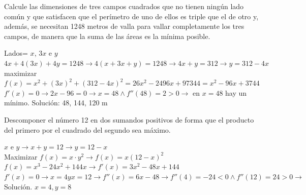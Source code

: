 \documentclass[addpoints,spanish, 12pt,a4paper]{exam}
\begin{document}
\begin{questions}


\question[3] Calcule las dimensiones de tres campos cuadrados que no tienen ningún lado común y que
satisfacen que el perímetro de uno de ellos es triple que el de otro y, además, se necesitan 1248 metros de
valla para vallar completamente los tres campos, de manera que la suma de las áreas es la mínima posible.
\begin{solution}
    Lados= $x$, $3x$ e $y$ \\
    $4x+4(3x)+4y=1248 \to 4(x+3x+y)=1248 \to 4x+y=312 \to y=312-4x$ \\
    maximizar $f(x)=x^2+(3x)^2+(312-4x)^2=26 x^{2} - 2496 x + 97344= x^{2} - 96 x + 3744$ \\
    $f'(x)=0 \to 2x-96=0 \to x=48 \land f''(48)=2>0 \to$ en $x=48$ hay un mínimo.
    Solución: 48, 144, 120 m  
    
\end{solution}

\question[2] Descomponer el número 12 en dos sumandos positivos de forma que el producto
del primero por el cuadrado del segundo sea máximo.
\begin{solution}
    $x$ e $y \to x+y =12 \to y=12-x$ \\
    Maximizar $f(x)=x\cdot y^2 \to f(x)=x\left(12-x\right)^2$ \\
    $f(x)=x^{3} - 24 x^{2} + 144 x \to f'(x)=3 x^{2} - 48 x + 144$ \\
    $f'(x)=0 \to x=4 y x=12 \to f''(x)=6x-48 \to f''(4)=-24<0 \land f''(12)=24>0 \to$ Solución. $x=4, y=8$
\end{solution}


\end{questions}
\end{document}
